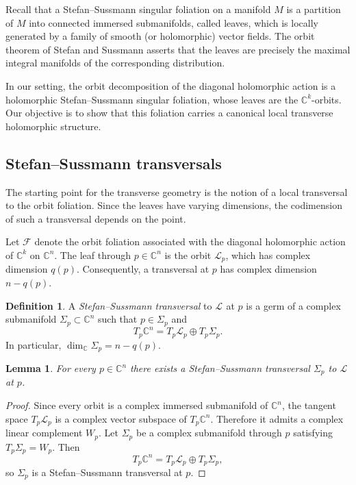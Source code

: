 \documentclass[11pt]{amsart}
\newtheorem{lemma}[theorem]{Lemma}
\theoremstyle{definition}
\newtheorem{definition}[theorem]{Definition}
\theoremstyle{remark}
\newcommand{\C}{\mathbb{C}}
\newcommand{\leaf}[1]{\mathcal{L}_{#1}}
\begin{document}
Recall that a Stefan--Sussmann singular foliation on a manifold $M$ is a partition of $M$ into connected immersed submanifolds, called leaves, which is locally generated by a family of smooth (or holomorphic) vector fields.
The orbit theorem of Stefan and Sussmann asserts that the leaves are precisely the maximal integral manifolds of the corresponding distribution.

In our setting, the orbit decomposition of the diagonal holomorphic action is a holomorphic Stefan--Sussmann singular foliation, whose leaves are the $\C^k$-orbits.
Our objective is to show that this foliation carries a canonical local transverse holomorphic structure.

\subsection{Stefan--Sussmann transversals}
The starting point for the transverse geometry is the notion of a local transversal to the orbit foliation.
Since the leaves have varying dimensions, the codimension of such a transversal depends on the point.


Let $\mathcal F$ denote the orbit foliation associated with the
diagonal holomorphic action of $\C^k$ on $\C^n$. The leaf through
$p\in\C^n$ is the orbit $\leaf{p}$, which has complex dimension
$q(p)$. Consequently, a transversal at $p$ has complex dimension
$n-q(p)$.

\begin{definition}
	A \emph{Stefan--Sussmann transversal} to $\leaf{}$ at $p$ is a germ of a complex submanifold $\Sigma_p\subset\C^n$ such that $p\in\Sigma_p$ and 
 	$$ 
		T_p\C^n = T_p\leaf{p} \oplus T_p\Sigma_p.
	$$
	In particular, $\dim_{\C}\Sigma_p=n-q(p)$.
\end{definition}

\begin{lemma}
	For every $p\in\C^n$ there exists a Stefan--Sussmann transversal $\Sigma_p$ to $\leaf{}$ at $p$.
\end{lemma}

\begin{proof}
	Since every orbit is a complex immersed submanifold of $\C^n$, the tangent space $T_p\leaf{p}$ is a complex vector subspace of $T_p\C^n$.
	Therefore it admits a complex linear complement $W_p$.
	Let $\Sigma_p$ be a complex submanifold through $p$ satisfying $T_p\Sigma_p=W_p$.
	Then
	$$
		T_p\C^n = T_p \leaf{p} \oplus T_p\Sigma_p,
	$$
	so $\Sigma_p$ is a Stefan--Sussmann transversal at $p$.
\end{proof}
\end{document}
